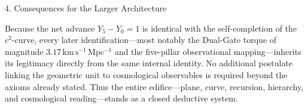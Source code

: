 4. Consequences for the Larger Architecture

Because the net advance \(Y_5-Y_0=1\) is identical with the self-completion of the \(c^2\)-curve, every later identification—most notably the Dual-Gate torque of magnitude \(3.17\,\mathrm{km\,s^{-1}\,Mpc^{-1}}\) and the five-pillar observational mapping—inherits its legitimacy directly from the same internal identity. No additional postulate linking the geometric unit to cosmological observables is required beyond the axioms already stated. Thus the entire edifice—plane, curve, recursion, hierarchy, and cosmological reading—stands as a closed deductive system.
